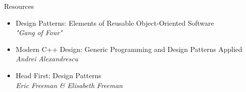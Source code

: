 \documentclass{beamer}
\begin{document}
\begin{frame}{Resources}
\begin{itemize}
  \item Design Patterns: Elements of Reusable Object-Oriented Software\\
    \small{\textit{"Gang of Four"}}
  \item Modern C++ Design: Generic Programming and Design Patterns Applied\\
    \small{\textit{Andrei Alexandrescu}}
  \item Head First: Design Patterns \\
    \small{\textit{Eric Freeman \& Elisabeth Freeman}}
\end{itemize}
\end{frame}

\begin{frame}
\end{frame}
\end{document}
